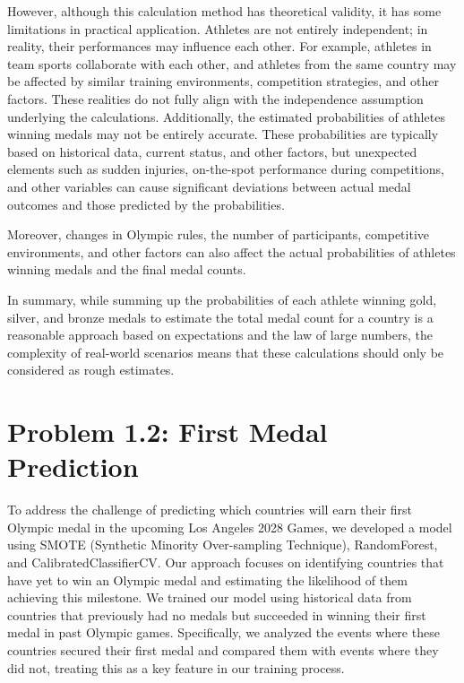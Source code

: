 \documentclass[12pt]{article}
\begin{document}
However, although this calculation method has theoretical validity, it has some limitations in practical application. Athletes are not entirely independent; in reality, their performances may influence each other. For example, athletes in team sports collaborate with each other, and athletes from the same country may be affected by similar training environments, competition strategies, and other factors. These realities do not fully align with the independence assumption underlying the calculations. Additionally, the estimated probabilities of athletes winning medals may not be entirely accurate. These probabilities are typically based on historical data, current status, and other factors, but unexpected elements such as sudden injuries, on-the-spot performance during competitions, and other variables can cause significant deviations between actual medal outcomes and those predicted by the probabilities.

Moreover, changes in Olympic rules, the number of participants, competitive environments, and other factors can also affect the actual probabilities of athletes winning medals and the final medal counts.

In summary, while summing up the probabilities of each athlete winning gold, silver, and bronze medals to estimate the total medal count for a country is a reasonable approach based on expectations and the law of large numbers, the complexity of real-world scenarios means that these calculations should only be considered as rough estimates.



\section{Problem 1.2: First Medal Prediction}

To address the challenge of predicting which countries will earn their first Olympic medal in the upcoming Los Angeles 2028 Games, we developed a model using SMOTE (Synthetic Minority Over-sampling Technique), RandomForest, and CalibratedClassifierCV. Our approach focuses on identifying countries that have yet to win an Olympic medal and estimating the likelihood of them achieving this milestone. We trained our model using historical data from countries that previously had no medals but succeeded in winning their first medal in past Olympic games. Specifically, we analyzed the events where these countries secured their first medal and compared them with events where they did not, treating this as a key feature in our training process.
\end{document}
